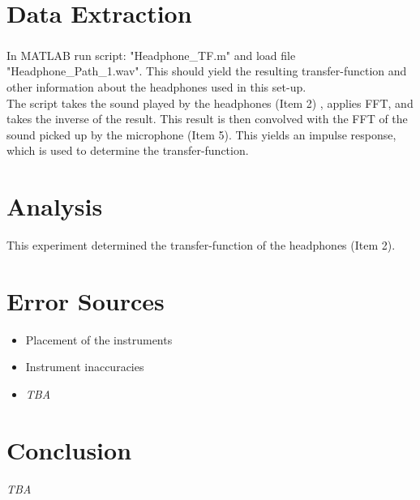 \documentclass[12pt,a4paper,openright]{article}
\begin{document}
\section{Data Extraction}
In MATLAB\textsuperscript{\textregistered} run script: "Headphone\_TF.m" and load file "Headphone\_Path\_1.wav". This should yield the resulting transfer-function and other information about the headphones used in this set-up.\\
\indent The script takes the sound played by the headphones (Item 2) , applies FFT, and takes the inverse of the result. This result is then convolved with the FFT of the sound picked up by the microphone (Item 5). This yields an impulse response, which is used to determine the transfer-function.

\section{Analysis}
This experiment determined the transfer-function of the headphones (Item 2).

\section{Error Sources}
\begin{itemize}
	\item Placement of the instruments
	\item Instrument inaccuracies 
	\item \textit{TBA}
\end{itemize}

\section{Conclusion}
\textit{TBA}
\end{document}
